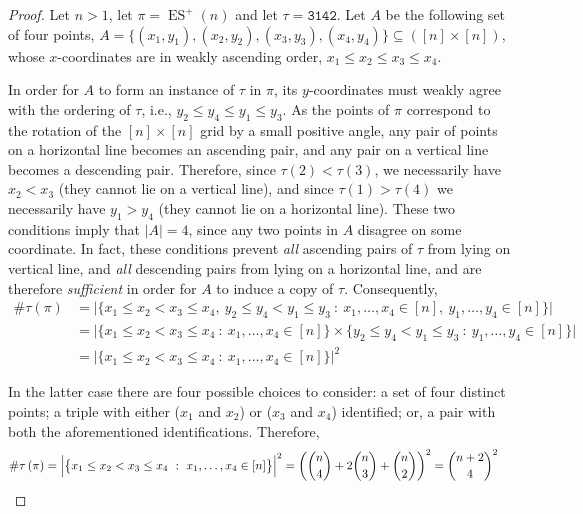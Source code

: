 \documentclass{article}
\newcommand{\pc}[2]{{\# \mathtt{ #1 } \left( #2 \right)}}
\DeclareMathOperator{\ES}{ES}
\theoremstyle{remark}
\theoremstyle{plain}
\begin{document}
\begin{proof}
    Let $n > 1$, let $\pi = \ES^+(n)$ and let $\tau = \mathtt{3142}$. Let $A$ be the following set of four points, $A = \{(x_1, y_1), (x_2, y_2), (x_3, y_3), (x_4, y_4)\} \subseteq ([n] \times [n])$, whose $x$-coordinates are in weakly ascending order, $x_1 \le x_2 \le x_3 \le x_4$.
    
    In order for $A$ to form an instance of $\tau$ in $\pi$, its $y$-coordinates must weakly agree with the ordering of $\tau$, i.e., $y_2 \le y_4 \le y_1 \le y_3$. As the points of $\pi$ correspond to the rotation of the $[n] \times [n]$ grid by a small positive angle, any pair of points on a horizontal line becomes an ascending pair, and any pair on a vertical line becomes a descending pair. Therefore, since $\tau(2) < \tau(3)$, we necessarily have $x_2 < x_3$ (they cannot lie on a vertical line), and since $\tau(1) > \tau(4)$ we necessarily have $y_1 > y_4$ (they cannot lie on a horizontal line). These two conditions imply that $|A|=4$, since any two points in $A$ disagree on some coordinate. In fact, these conditions prevent \emph{all} ascending pairs of $\tau$ from lying on vertical line, and \emph{all} descending pairs from lying on a horizontal line, and are therefore \emph{sufficient} in order for $A$ to induce a copy of $\tau$. Consequently,
    \begin{align*}
        \pc{\tau}{\pi} &= \Big| \big\{x_1 \le x_2 < x_3 \le x_4,\  y_2 \le y_4 < y_1 \le y_3\ :\ x_1,\dots,x_4 \in [n],\ y_1,\dots,y_4 \in [n] \big\} \Big| \\
        &= \Big| \big\{x_1 \le x_2 < x_3 \le x_4\ :\ x_1,\dots,x_4 \in [n] \big\} \times \big\{ y_2 \le y_4 < y_1 \le y_3\ :\ y_1,\dots,y_4 \in [n] \big\} \Big| \\
        &= \Big| \big\{x_1 \le x_2 < x_3 \le x_4\ :\ x_1,\dots,x_4 \in [n] \big\} \Big|^2
    \end{align*}

    In the latter case there are four possible choices to consider: a set of four distinct points; a triple with either ($x_1$ and $x_2$) or ($x_3$ and $x_4$) identified; or, a pair with both the aforementioned identifications. Therefore, 
    \begin{align*}
        \pc{\tau}{\pi} &= \Big| \big\{x_1 \le x_2 < x_3 \le x_4\ :\ x_1,\dots,x_4 \in [n] \big\} \Big|^2 = \left( \binom{n}{4} + 2\binom{n}{3} + \binom{n}{2} \right)^2 = \binom{n+2}{4}^2 \qedhere
    \end{align*}
\end{proof}
\end{document}
